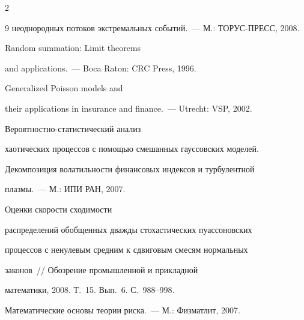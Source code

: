 \begin{multicols}{2}
{{\begin{thebibliography}{9}
неоднородных потоков экстремальных событий.~--- М.: ТОРУС-ПРЕСС, 2008. %









Random summation: Limit theorems


and applications.~--- Boca Raton: CRC Press, 1996. %









Generalized Poisson models and


their applications in insurance and finance.~--- Utrecht: VSP, 2002. %









Вероятностно-статистический анализ


хаотических процессов с помощью смешанных гауссовских моделей.


Декомпозиция волатильности финансовых индексов и турбулентной


плазмы.~--- М.: ИПИ РАН, 2007. %









Оценки скорости сходимости


распределений обобщенных дважды стохастических пуассоновских


процессов с ненулевым средним к сдвиговым смесям нормальных


законов~// Обозрение промышленной и прикладной


математики, 2008. Т.~15. Вып.~6. С.~988--998. %









Математические основы теории риска.~--- М.: Физматлит, 2007. %








\end{thebibliography}}}
\end{multicols}
